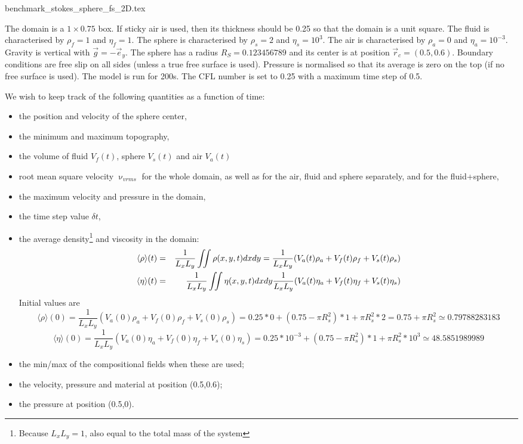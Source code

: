 \begin{flushright} {\tiny {\color{gray} benchmark\_stokes\_sphere\_fs\_2D.tex}} \end{flushright}

The domain is a $1\times 0.75$ box. If sticky air is used, then its thickness should be 0.25 so that the
domain is a unit square. 
The fluid is characterised by $\rho_f=1$ and $\eta_f=1$. The sphere is characterised by $\rho_s=2$ and
$\eta_s=10^3$. The air is characterised by $\rho_a=0$ and $\eta_a=10^{-3}$. Gravity is 
vertical with $\vec{g}=-\vec{e}_y$.
The sphere has a radius $R_S=0.123456789$ and its center is at position $\vec{r}_c=(0.5,0.6)$. 
Boundary conditions are free slip on all sides (unless a true free surface is used).
Pressure is normalised so that its average is zero on the top (if no free surface is used).
The model is run for 200s. The CFL number is set to 0.25 with a maximum time step of 0.5. 

We wish to keep track of the following quantities as a function of time:
\begin{itemize}
\item the position and velocity of the sphere center,
\item the minimum and maximum topography,
\item the volume of fluid $V_f(t)$, sphere $V_s(t)$ and air $V_a(t)$
\item root mean square velocity $\upnu_{vrms}$ for the whole domain, as well as for the air, fluid and sphere 
      separately, and for the fluid+sphere,
\item the maximum velocity and pressure in the domain,
\item the time step value $\delta t$,
\item the average density\footnote{Because $L_xL_y=1$, also equal to the total mass of the system} and viscosity in the domain:
\begin{eqnarray}
\langle \rho \rangle (t) &=& \frac{1}{L_xL_y} \iint \rho(x,y,t) dx dy
= \frac{1}{L_xL_y} ( V_a(t)\rho_a + V_f(t)\rho_f + V_s(t)\rho_s )  \nonumber\\
\langle \eta \rangle (t) &=& \frac{1}{L_xL_y} \iint \eta(x,y,t) dx dy
\frac{1}{L_xL_y} ( V_a(t) \eta_a + V_f(t)\eta_f  + V_s(t)\eta_s ) 
\end{eqnarray}
Initial values are 
\[
\langle \rho \rangle (0) = \frac{1}{L_xL_y} ( V_a(0)\rho_a + V_f(0)\rho_f + V_s(0)\rho_s )  
= 0.25*0 + (0.75-\pi R_s^2)*1 + \pi R_s^2* 2 = 0.75 + \pi R_s^2  \simeq 0.79788283183
\]
\[
\langle \eta \rangle (0) = \frac{1}{L_xL_y} ( V_a(0)\eta_a + V_f(0)\eta_f + V_s(0)\eta_s )  
= 0.25*10^{-3} + (0.75-\pi R_s^2)*1 + \pi R_s^2* 10^3   \simeq 48.5851989989
\]



\item the min/max of the compositional fields when these are used;
\item the velocity, pressure and material at position (0.5,0.6);
\item the pressure at position (0.5,0).
\end{itemize}

